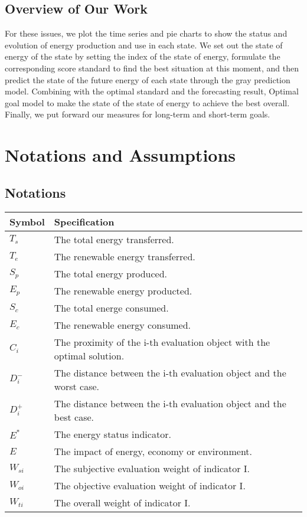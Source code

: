 \documentclass{mcmthesis}
\begin{document}
\subsection{Overview of Our Work}
For these issues, we plot the time series and pie charts to show the status and evolution of energy production and use in each state. We set out the state of energy of the state by setting the index of the state of energy, formulate the corresponding score standard to find the best situation at this moment, and then predict the state of the future energy of each state through the gray prediction model. Combining with the optimal standard and the forecasting result, Optimal goal model to make the state of the state of energy to achieve the best overall. Finally, we put forward our measures for long-term and short-term goals.

\section{Notations and Assumptions}
\subsection{Notations}
\begin{table}[H]
  \centering
  \begin{tabular}{ll}
    \toprule
    Symbol & Specification \\
    \toprule
    $T_s$  &  The total energy transferred. \\
    $T_e$  &  The renewable energy transferred.\\
    $S_p$  &  The total energy produced.\\
    $E_p$  &  The renewable energy producted.\\
    $S_c$  &  The total energe consumed.\\
    $E_c$  &  The renewable energy consumed.\\
    $C_i$  &  The proximity of the i-th evaluation object with the optimal solution.\\
    $D^-_i$  &  The distance between the i-th evaluation object and the worst case.\\
    $D^+_i$  &  The distance between the i-th evaluation object and the best case.\\
    $E^*$  &  The energy status indicator.\\
    $E$    &  The impact of energy, economy or environment.\\
    $W_{si}$  &  The subjective evaluation weight of indicator I.\\
    $W_{oi}$  &  The objective evaluation weight of indicator I.\\
    $W_{ti}$  &  The overall weight of indicator I.\\    

    \bottomrule
  \end{tabular}
\end{table}
\end{document}
